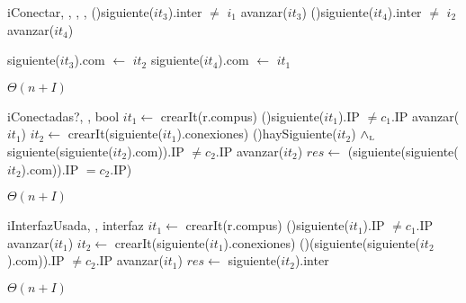 \begin{Algoritmos}
\begin{algoritmo}{iConectar}{, , , , }{}
    \While(){siguiente($it_{3}$).inter $\neq$ $i_{1}$}{
      avanzar($it_{3}$)
    }
    \While(){siguiente($it_{4}$).inter $\neq$ $i_{2}$}{
      avanzar($it_{4}$)
    }

    siguiente($it_{3}$).com $\gets$ $it_{2}$
    siguiente($it_{4}$).com $\gets$ $it_{1}$
  \end{algoritmo}
  \datosAlgoritmo{} %
  {} %
  {} %
  {$\Theta(n+I)$} %
  {} %
  
  
  \begin{algoritmo}{iConectadas?}{, , }{bool}{}
     $it_{1} \gets$ crearIt(r.compus)
    \While(){siguiente($it_{1}$).IP $\neq c_{1}$.IP}{
      avanzar($it_{1}$)
    }
     $it_{2} \gets$ crearIt(siguiente($it_{1}$).conexiones)
    \While(){haySiguiente($it_{2}$) $\land_{\mathrm{\scriptscriptstyle{L}}}$ siguiente(siguiente($it_{2}$).com)).IP $\neq c_{2}$.IP}{
      avanzar($it_{2}$)
    }
    $res \gets$ (siguiente(siguiente($it_{2}$).com)).IP $= c_{2}$.IP)
  \end{algoritmo}  
 \datosAlgoritmo{} %
  {} %
  {} %
  {$\Theta(n+I)$} %
  {} %

  \begin{algoritmo}{iInterfazUsada}{, , }{interfaz}{}
     $it_{1} \gets$ crearIt(r.compus)  
    \While(){siguiente($it_{1}$).IP $\neq c_{1}$.IP}{
      avanzar($it_{1}$)
    }
     $it_{2} \gets$ crearIt(siguiente($it_{1}$).conexiones)
    \While(){(siguiente(siguiente($it_{2}$).com)).IP $\neq c_{2}$.IP}{
      avanzar($it_{1}$)
    }
    $res \gets$ siguiente($it_{2}$).inter
  \end{algoritmo}  
 \datosAlgoritmo{} %
  {} %
  {} %
  {$\Theta(n+I)$} %
  {} %
    

\end{Algoritmos}
